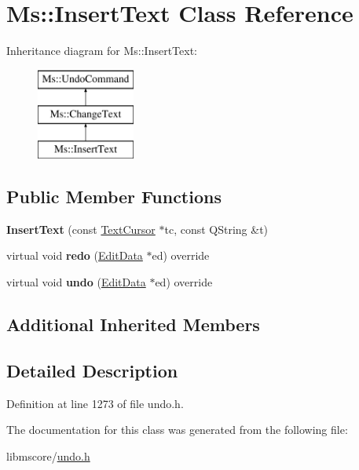 \hypertarget{class_ms_1_1_insert_text}{}\section{Ms\+:\+:Insert\+Text Class Reference}
\label{class_ms_1_1_insert_text}
Inheritance diagram for Ms\+:\+:Insert\+Text\+:\begin{figure}[H]
\begin{center}
\leavevmode
\includegraphics[height=3.000000cm]{class_ms_1_1_insert_text}
\end{center}
\end{figure}
\subsection*{Public Member Functions}
\begin{DoxyCompactItemize}
\item 
\mbox{\label{class_ms_1_1_insert_text_a8e86b395f84150fa130014e95f0aacfc}} 
{\bfseries Insert\+Text} (const \hyperlink{class_ms_1_1_text_cursor}{Text\+Cursor} $\ast$tc, const Q\+String \&t)
\item 
\mbox{\label{class_ms_1_1_insert_text_a1368c1d69c4e47e12f6a783efd0b9bbd}} 
virtual void {\bfseries redo} (\hyperlink{class_ms_1_1_edit_data}{Edit\+Data} $\ast$ed) override
\item 
\mbox{\label{class_ms_1_1_insert_text_aa3a0556202ca1992d63937111580cc8c}} 
virtual void {\bfseries undo} (\hyperlink{class_ms_1_1_edit_data}{Edit\+Data} $\ast$ed) override
\end{DoxyCompactItemize}
\subsection*{Additional Inherited Members}


\subsection{Detailed Description}


Definition at line 1273 of file undo.\+h.



The documentation for this class was generated from the following file\+:\begin{DoxyCompactItemize}
\item 
libmscore/\hyperlink{undo_8h}{undo.\+h}\end{DoxyCompactItemize}
